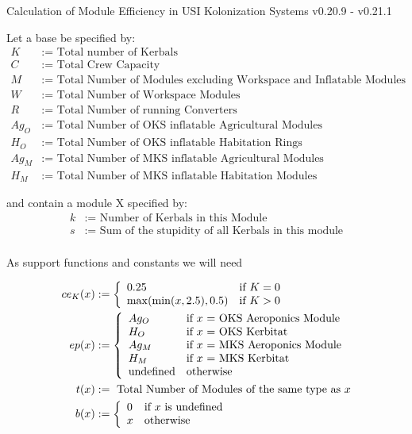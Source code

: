 \documentclass[11pt]{report}
\begin{document}
Calculation of Module Efficiency in USI Kolonization Systems v0.20.9 - v0.21.1

Let a base be specified by:
\begin{align*}
  K & := \textrm{ Total number of Kerbals}\\
  C & := \textrm{ Total Crew Capacity}\\
  M & := \textrm{ Total Number of Modules excluding Workspace and Inflatable Modules}\\
  W & := \textrm{ Total Number of Workspace Modules}\\
  R & := \textrm{ Total Number of running Converters}\\
  Ag_O & := \textrm{ Total Number of OKS inflatable Agricultural Modules}\\
  H_O & := \textrm{ Total Number of OKS inflatable Habitation Rings}\\
  Ag_M & := \textrm{ Total Number of MKS inflatable Agricultural Modules}\\
  H_M & := \textrm{ Total Number of MKS inflatable Habitation Modules}
\end{align*}

and contain a module X specified by:
\begin{align*}
  k & := \textrm{ Number of Kerbals in this Module}\\
  s & := \textrm{ Sum of the stupidity of all Kerbals in this module}\\
\end{align*}

As support functions and constants we will need

\begin{align*}
ce_K(x) & := \left\{
  \begin{array}{l l}
    0.25 & \textrm{if } K = 0\\
    \max(\min(x, 2.5), 0.5) &\textrm{if } K > 0
  \end{array}
\right.\\
ep(x) & :=\left\{
  \begin{array}{l l}
    Ag_O & \textrm{if $x$ = OKS Aeroponics Module}\\
    H_O & \textrm{if $x$ = OKS Kerbitat}\\
    Ag_M & \textrm{if $x$ = MKS Aeroponics Module}\\
    H_M & \textrm{if $x$ = MKS Kerbitat}\\
    \textrm{undefined} & \textrm{otherwise}
  \end{array}
\right.\\
t(x) & := \textrm{ Total Number of Modules of the same type as $x$}\\
b(x) & := \left\{
  \begin{array}{l l}
    0 & \textrm{if $x$ is undefined}\\
    x & \textrm{otherwise}
  \end{array}
\right.
\end{align*}
\end{document}
